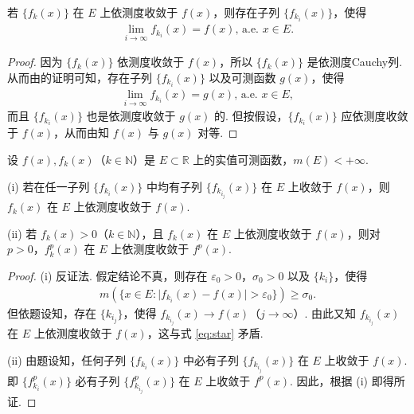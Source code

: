 \documentclass[../../main.tex]{subfiles}
\begin{document}
\begin{theorem}[Riesz(里斯)定理]\label{theorem:Riesz定理}
若 $\{f_k(x)\}$ 在 $E$ 上依测度收敛于 $f(x)$，则存在子列 $\{f_{k_i}(x)\}$，使得
\begin{align*}
\lim_{i\to\infty}f_{k_i}(x)=f(x),\, \text{a.e. }x\in E.
\end{align*}
\end{theorem}
\begin{proof}
因为 $\{f_k(x)\}$ 依测度收敛于 $f(x)$，所以 $\{f_k(x)\}$ 是依测度Cauchy列. 从而由的证明可知，存在子列 $\{f_{k_i}(x)\}$ 以及可测函数 $g(x)$，使得
\begin{align*}
\lim_{i\to\infty}f_{k_i}(x)=g(x),\,\text{a.e. }x\in E,
\end{align*}
而且 $\{f_{k_i}(x)\}$ 也是依测度收敛于 $g(x)$ 的. 但按假设，$\{f_{k_i}(x)\}$ 应依测度收敛于 $f(x)$，从而由知 $f(x)$ 与 $g(x)$ 对等. 

\end{proof}

\begin{example}
设 $f(x),f_k(x)$（$k\in\mathbb{N}$）是 $E\subset\mathbb{R}$ 上的实值可测函数，$m(E)<+\infty$.

(i) 若在任一子列 $\{f_{k_i}(x)\}$ 中均有子列 $\{f_{k_{i_j}}(x)\}$ 在 $E$ 上收敛于 $f(x)$，则 $f_k(x)$ 在 $E$ 上依测度收敛于 $f(x)$.

(ii) 若 $f_k(x)>0$（$k\in\mathbb{N}$），且 $f_k(x)$ 在 $E$ 上依测度收敛于 $f(x)$，则对 $p>0$，$f_k^p(x)$ 在 $E$ 上依测度收敛于 $f^p(x)$.
\end{example}
\begin{proof}
(i) 反证法. 假定结论不真，则存在 $\varepsilon_0>0$，$\sigma_0>0$ 以及 $\{k_i\}$，使得
\begin{align}
m(\{x\in E:\vert f_{k_i}(x)-f(x)\vert>\varepsilon_0\})\geqslant\sigma_0.\label{eq:star}
\end{align}
但依题设知，存在 $\{k_{i_j}\}$，使得 $f_{k_{i_j}}(x)\to f(x)$（$j\to\infty$）. 由此又知 $f_{k_{i_j}}(x)$ 在 $E$ 上依测度收敛于 $f(x)$，这与式 \eqref{eq:star} 矛盾.

(ii) 由题设知，任何子列 $\{f_{k_i}(x)\}$ 中必有子列 $\{f_{k_{i_j}}(x)\}$ 在 $E$ 上收敛于 $f(x)$. 即 $\{f_{k_i}^p(x)\}$ 必有子列 $\{f_{k_{i_j}}^p(x)\}$ 在 $E$ 上收敛于 $f^p(x)$. 因此，根据 (i) 即得所证. 

\end{proof}
\end{document}
